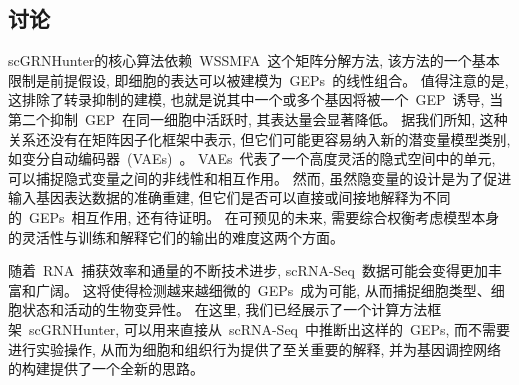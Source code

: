 \subsection{讨论}
scGRNHunter的核心算法依赖~WSSMFA~这个矩阵分解方法, 该方法的一个基本限制是前提假设, 
即细胞的表达可以被建模为~GEPs~的线性组合。
值得注意的是, 这排除了转录抑制的建模, 也就是说其中一个或多个基因将被一个~GEP~诱导,
当第二个抑制~GEP~在同一细胞中活跃时, 其表达量会显著降低。
据我们所知, 这种关系还没有在矩阵因子化框架中表示, 但它们可能更容易纳入新的潜变量模型类别,
如变分自动编码器~(VAEs)~\cite{ding2018interpretable,gronbech2018scvae}。
VAEs~代表了一个高度灵活的隐式空间中的单元, 可以捕捉隐式变量之间的非线性和相互作用。
然而, 虽然隐变量的设计是为了促进输入基因表达数据的准确重建, 
但它们是否可以直接或间接地解释为不同的~GEPs~相互作用, 还有待证明。
在可预见的未来, 需要综合权衡考虑模型本身的灵活性与训练和解释它们的输出的难度这两个方面。

随着~RNA~捕获效率和通量的不断技术进步, scRNA-Seq~数据可能会变得更加丰富和广阔。
这将使得检测越来越细微的~GEPs~成为可能, 从而捕捉细胞类型、细胞状态和活动的生物变异性。
在这里, 我们已经展示了一个计算方法框架~scGRNHunter, 
可以用来直接从~scRNA-Seq~中推断出这样的~GEPs, 
而不需要进行实验操作, 从而为细胞和组织行为提供了至关重要的解释, 
并为基因调控网络的构建提供了一个全新的思路。